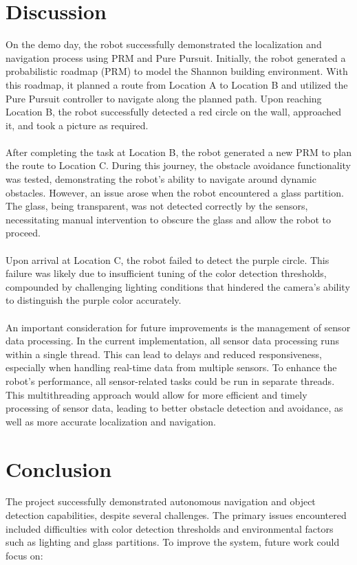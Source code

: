 \documentclass{article}
\begin{document}
	\section{Discussion}
	On the demo day, the robot successfully demonstrated the localization and navigation process using PRM and Pure Pursuit. Initially, the robot generated a probabilistic roadmap (PRM) to model the Shannon building environment. With this roadmap, it planned a route from Location A to Location B and utilized the Pure Pursuit controller to navigate along the planned path. Upon reaching Location B, the robot successfully detected a red circle on the wall, approached it, and took a picture as required.
	\\\\
	After completing the task at Location B, the robot generated a new PRM to plan the route to Location C. During this journey, the obstacle avoidance functionality was tested, demonstrating the robot's ability to navigate around dynamic obstacles. However, an issue arose when the robot encountered a glass partition. The glass, being transparent, was not detected correctly by the sensors, necessitating manual intervention to obscure the glass and allow the robot to proceed.
	\\\\
	Upon arrival at Location C, the robot failed to detect the purple circle. This failure was likely due to insufficient tuning of the color detection thresholds, compounded by challenging lighting conditions that hindered the camera's ability to distinguish the purple color accurately.
	\\\\
	An important consideration for future improvements is the management of sensor data processing. In the current implementation, all sensor data processing runs within a single thread. This can lead to delays and reduced responsiveness, especially when handling real-time data from multiple sensors. To enhance the robot's performance, all sensor-related tasks could be run in separate threads. This multithreading approach would allow for more efficient and timely processing of sensor data, leading to better obstacle detection and avoidance, as well as more accurate localization and navigation.
	
	\section{Conclusion}
	The project successfully demonstrated autonomous navigation and object detection capabilities, despite several challenges. The primary issues encountered included difficulties with color detection thresholds and environmental factors such as lighting and glass partitions. To improve the system, future work could focus on:
	
\end{document}
